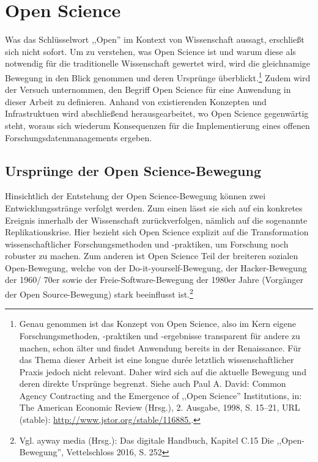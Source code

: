\onehalfspacing

\section{Open Science}

Was das Schlüsselwort ,,Open'' im Kontext von Wissenschaft aussagt, erschließt sich nicht sofort. Um zu verstehen, was Open Science ist und warum diese als notwendig für die traditionelle Wissenschaft gewertet wird, wird die gleichnamige Bewegung in den Blick genommen und deren Ursprünge überblickt.\footnote{Genau genommen ist das Konzept von Open Science, also im Kern eigene Forschungsmethoden,  -praktiken und -ergebnisse transparent für andere zu machen, schon älter und findet Anwendung bereits in der Renaissance. Für das Thema dieser Arbeit ist eine longue durée letztlich wissenschaftlicher Praxis jedoch nicht relevant. Daher wird sich auf die aktuelle Bewegung und deren direkte Ursprünge begrenzt. Siehe auch Paul A. David: Common Agency Contracting and the Emergence of ,,Open Science'' Institutions, in: The American Economic Review (Hrsg.), 2. Ausgabe, 1998, S. 15–21, URL (stable): \url{http://www.jstor.org/stable/116885.}.} Zudem wird der Versuch unternommen, den Begriff Open Science für eine Anwendung in dieser Arbeit zu definieren. Anhand von existierenden Konzepten und Infrastruktuen wird abschließend herausgearbeitet, wo Open Science gegenwärtig steht, woraus sich wiederum Konsequenzen für die Implementierung eines offenen Forschungsdatenmanagements ergeben. 

\subsection{Ursprünge der Open Science-Bewegung}

Hinsichtlich der Entstehung der Open Science-Bewegung können zwei Entwicklungsstränge verfolgt werden. Zum einen lässt sie sich auf ein konkretes Ereignis innerhalb der Wissenschaft zurückverfolgen, nämlich auf die sogenannte Replikationskrise. Hier bezieht sich Open Science explizit auf die Transformation wissenschaftlicher Forschungsmethoden und -praktiken, um Forschung noch robuster zu machen. Zum anderen ist Open Science Teil der breiteren sozialen Open-Bewegung, welche von der Do-it-yourself-Bewegung, der Hacker-Bewegung der 1960/ 70er sowie der Freie-Software-Bewegung der 1980er Jahre
(Vorgänger der Open Source-Bewegung) stark beeinflusst ist.\footnote{Vgl. ayway media (Hrsg.): Das digitale Handbuch,
Kapitel C.15 Die ,,Open-Bewegung'', Vettelschloss 2016, S. 252}

